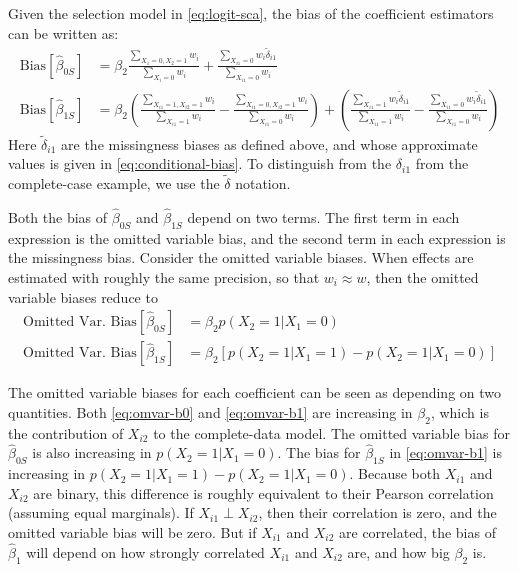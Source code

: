 \documentclass[
]{article}
\begin{document}
Given the selection model in \eqref{eq:logit-sca}, the bias of the coefficient estimators can be written as:
\begin{align}
\text{Bias}[\hat{\beta}_{0S}]
  & = \beta_2 \frac{\sum_{X_1 = 0, X_2 = 1} w_i}{\sum_{X_i = 0} w_i} + \frac{\sum_{X_{i1} = 0} w_i \tilde{\delta}_{i1}}{\sum_{X_{i1} = 0} w_i}  \\
\text{Bias}[\hat{\beta}_{1S}]
  & = \beta_2 \left(\frac{\sum_{X_{i1} = 1, X_{i2} = 1} w_i}{\sum_{X_{i1} = 1} w_i} - \frac{\sum_{X_{i1} = 0, X_{i2} = 1} w_i}{\sum_{X_{i1} = 0} w_i}\right) + \left(\frac{\sum_{X_{i1} = 1} w_i \tilde{\delta}_{i1}}{\sum_{X_{i1} = 1} w_i} - \frac{\sum_{X_{i1} = 0} w_i \tilde{\delta}_{i1}}{\sum_{X_{i1} = 0} w_i}\right)
\end{align}
Here \(\tilde{\delta}_{i1}\) are the missingness biases as defined above, and whose approximate values is given in \eqref{eq:conditional-bias}.
To distinguish from the \(\delta_{i1}\) from the complete-case example, we use the \(\tilde{\delta}\) notation.

Both the bias of \(\hat{\beta}_{0S}\) and \(\hat{\beta}_{1S}\) depend on two terms.
The first term in each expression is the omitted variable bias, and the second term in each expression is the missingness bias.
Consider the omitted variable biases.
When effects are estimated with roughly the same precision, so that \(w_i \approx w\), then the omitted variable biases reduce to
\begin{align}
\text{Omitted Var. Bias}[\hat{\beta}_{0S}]
  & = \beta_2 p(X_2 = 1 | X_1 = 0) \label{eq:omvar-b0}\\
\text{Omitted Var. Bias}[\hat{\beta}_{1S}]
  & = \beta_2 \left[p(X_2 = 1 | X_1 = 1) - p(X_2 = 1 | X_1 = 0) \right] \label{eq:omvar-b1}
\end{align}

The omitted variable biases for each coefficient can be seen as depending on two quantities.
Both \eqref{eq:omvar-b0} and \eqref{eq:omvar-b1} are increasing in \(\beta_2\), which is the contribution of \(X_{i2}\) to the complete-data model.
The omitted variable bias for \(\hat{\beta}_{0S}\) is also increasing in \(p(X_2 = 1 | X_1 = 0)\).
The bias for \(\hat{\beta}_{1S}\) in \eqref{eq:omvar-b1} is increasing in \(p(X_2 = 1 | X_1 = 1) - p(X_2 = 1 | X_1 = 0)\).
Because both \(X_{i1}\) and \(X_{i2}\) are binary, this difference is roughly equivalent to their Pearson correlation (assuming equal marginals).
If \(X_{i1} \perp X_{i2}\), then their correlation is zero, and the omitted variable bias will be zero.
But if \(X_{i1}\) and \(X_{i2}\) are correlated, the bias of \(\hat{\beta}_1\) will depend on how strongly correlated \(X_{i1}\) and \(X_{i2}\) are, and how big \(\beta_2\) is.
\end{document}

